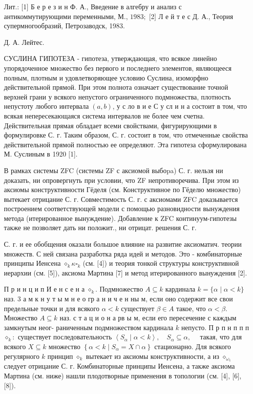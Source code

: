 \documentclass[10pt]{article}
\begin{document}
Лит.: [1] Б е р е з и н Ф. А., Введение в алгебру и анализ с антикоммутирующими переменными, М., $1983 ;$ [2] Л е й т е с Д. А., Теория супермногообразий, Петрозаводск, 1983.



Д. А. Лейтес.



СУСЛИНА ГИПОТЕЗА - гипотеза, утверждающая, что всякое линейно упорядоченное множество без первого и последнего элементов, являющееся полным, плотным и удовлетворяющее условию Суслина, изоморфно действительной прямой. При этом полнота означает существование точной верхней грани у всякого непустого ограниченного подмножества, плотность непустоту любого интервала $(a, b)$, у с ло в и е С у сл и н а состоит в том, что всякая непересекающаяся система интервалов не более чем счетна. Действительная прямая обладает всеми свойствами, фигурирующими в формулировке С. г. Таким образом, С. г. состоит в том, что отмеченные свойства действительной прямой полностью ее определяют. Эта гипотеза сформулирована М. Суслиным в 1920 [1].



В рамках системы ZFC (системы ZF с аксиомой выбоpa) С. г. нельзя ни доказать, ни опровергнуть при условии, что ZF непротиворечива. При этом из аксиомы конструктивности Гёделя (см. Конструктивное по Гёделю множество) вытекает отрицание С. г. Совместимость С. г. с аксиомами ZFC доказывается построением соответствующей модели с помощью разновидности вынуждения метода (итерированное вынуждение). Добавление к ZFC континуум-гипотезы также не позволяет дать ни положит., ни отрицат. решения С. г.



С. г. и ее обобщения оказали большое влияние на развитие аксиоматич. теории множеств. С ней связана разработка ряда идей и методов. Это - комбинаторные принципы Иенсена $\diamond_{k} \kappa \square_{k}$ (см. [4]) и теория тонкой структуры конструктивной иерархии (см. [5]), аксиома Мартина [7] и метод итерированного вынуждения [2].



П р и н ц и п И е н с е н а $\diamond_{k}$. Подмножество $A \subseteq k$ кардинала $k=\{\alpha \mid \alpha<k\}$ наз. 3 а м к н у т ы м н е о гр а н и ч е н ны м, если оно содержит все свои предельные точки и для всякого $\alpha<k$ существует $\beta \in A$ такое, что $\alpha<\beta$. Множество $A \subseteq k$ наз. с т а ц и о н а рв ы м, если его пересечение с каждым замкнутым неог- раниченным подмножеством кардинала $k$ непусто. П р п н п п п $\diamond_{k}:$ существует последовательность $\left\langle S_{\alpha} \mid \alpha<k\right\rangle, \quad S_{\alpha} \subseteq \alpha, \quad$ такая, что для всякого $X \subseteq k$ множество $\left\{\alpha<k \mid S_{\alpha}=X \cap \alpha\right\}$ стационарно. Для всякого регулярного $k$ принцип $\diamond_{k}$ вытекает из аксиомы конструктивности, а из $\diamond_{\omega_{1}}$ следует отрицание С. г. Комбинаторные принципы Иенсена, а также аксиома Мартина (см. ниже) нашли плодотворные применения в топологии (см. [4], [6], [8]).
\end{document}
